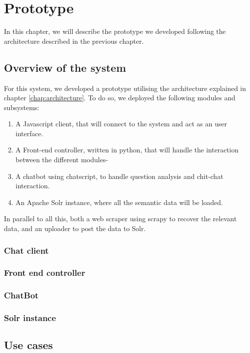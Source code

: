 \chapter{Prototype}
\label{chap:prototype}

\begin{chapterintro}

In this chapter, we will describe the prototype we developed following the architecture described in the previous chapter.
 
\end{chapterintro}

\cleardoublepage

\section{Overview of the system}

For this system, we developed a prototype utilising the architecture explained in chapter \ref{chap:architecture}. To do so, we deployed the following modules and subsystems:

\begin{enumerate}
 \item A Javascript client, that will connect to the system and act as an user interface.
 \item A Front-end controller, written in python, that will handle the interaction between the different modules-
 \item A chatbot using chatscript, to handle question analysis and chit-chat interaction.
 \item An Apache Solr instance, where all the semantic data will be loaded.
\end{enumerate}

In parallel to all this, both a web scraper using scrapy to recover the relevant data, and an uploader to post the data to Solr.

\subsection{Chat client}

\subsection{Front end controller}

\subsection{ChatBot}

\subsection{Solr instance}

\section{Use cases}
